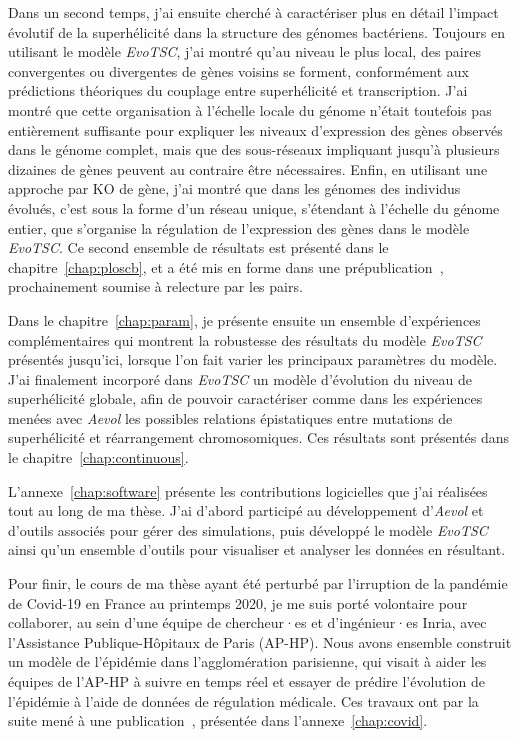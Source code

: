 Dans un second temps, j'ai ensuite cherché à caractériser plus en détail l'impact évolutif de la superhélicité dans la structure des génomes bactériens.
Toujours en utilisant le modèle \emph{EvoTSC}, j'ai montré qu'au niveau le plus local, des paires convergentes ou divergentes de gènes voisins se forment, conformément aux prédictions théoriques du couplage entre superhélicité et transcription.
J'ai montré que cette organisation à l'échelle locale du génome n'était toutefois pas entièrement suffisante pour expliquer les niveaux d'expression des gènes observés dans le génome complet, mais que des sous-réseaux impliquant jusqu'à plusieurs dizaines de gènes peuvent au contraire être nécessaires.
Enfin, en utilisant une approche par KO de gène, j'ai montré que dans les génomes des individus évolués, c'est sous la forme d'un réseau unique, s'étendant à l'échelle du génome entier, que s'organise la régulation de l'expression des gènes dans le modèle \emph{EvoTSC}.
Ce second ensemble de résultats est présenté dans le chapitre~\ref{chap:ploscb}, et a été mis en forme dans une prépublication~\citep{grohens2022b}, prochainement soumise à relecture par les pairs.

Dans le chapitre~\ref{chap:param}, je présente ensuite un ensemble d'expériences complémentaires qui montrent la robustesse des résultats du modèle \emph{EvoTSC} présentés jusqu'ici, lorsque l'on fait varier les principaux paramètres du modèle.
J'ai finalement incorporé dans \emph{EvoTSC} un modèle d'évolution du niveau de superhélicité globale, afin de pouvoir caractériser comme dans les expériences menées avec \emph{Aevol} les possibles relations épistatiques entre mutations de superhélicité et réarrangement chromosomiques.
Ces résultats sont présentés dans le chapitre~\ref{chap:continuous}.

L'annexe~\ref{chap:software} présente les contributions logicielles que j'ai réalisées tout au long de ma thèse.
J'ai d'abord participé au développement d'\emph{Aevol} et d'outils associés pour gérer des simulations, puis développé le modèle \emph{EvoTSC} ainsi qu'un ensemble d'outils pour visualiser et analyser les données en résultant.

Pour finir, le cours de ma thèse ayant été perturbé par l'irruption de la pandémie de Covid-19 en France au printemps 2020, je me suis porté volontaire pour collaborer, au sein d'une équipe de chercheur·es et d'ingénieur·es Inria, avec l'Assistance Publique-Hôpitaux de Paris (AP-HP).
Nous avons ensemble construit un modèle de l'épidémie dans l'agglomération parisienne, qui visait à aider les équipes de l'AP-HP à suivre en temps réel et essayer de prédire l'évolution de l'épidémie à l'aide de données de régulation médicale.
Ces travaux ont par la suite mené à une publication~\citep{gaubert2020}, présentée dans l'annexe~\ref{chap:covid}.

